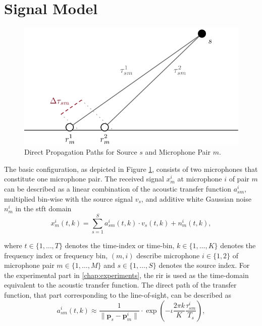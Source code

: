 \section{Signal Model}
\label{sec:signal}

\begin{figure}[!b]
\centering
    \includegraphics[scale=0.8]{data/figures/signal2}
    \caption{Direct Propagation Paths for Source $s$ and Microphone Pair $m$.}
    \label{fig:signal}
\end{figure}

The basic configuration, as depicted in Figure \ref{fig:signal}, consists of two microphones that constitute one microphone pair. The received signal $x^i_m$ at microphone $i$ of pair $m$ can be described as a linear combination of the acoustic transfer function $a^i_{sm}$, multiplied bin-wise with the source signal $v_s$, and additive white Gaussian noise $n^i_m$ in the \acrfull{stft} domain
\begin{equation}
	x_m^i(t,k)=\sum_{s=1}^{S}a_{sm}^i(t,k)\cdot v_s(t,k)+n_m^i(t,k),
	\label{eq:x}
\end{equation}

where $t\in\{1,\dots,T\}$ denotes the time-index or time-bin, $k\in\{1,\dots,K\}$ denotes the frequency index or frequency bin, $(m,i)$ describe microphone $i\in\{1,2\}$ of microphone pair $m\in\{1,\dots,M\}$ and $s\in\{1,\dots,S\}$ denotes the source index. For the experimental part in \autoref{chap:experiments}, the \gls{rir} is used as the time-domain equivalent to the acoustic transfer function. The direct path of the transfer function, that part corresponding to the line-of-sight, can be described as
\begin{equation}
	a_{sm}^i(t,k)\approx\frac{1}{\|\bm p_s-\bm p_m^i\|}\cdot\exp{\left(-\iota\frac{2\pi k}{K}\frac{\tau^i_{sm}}{T_s}\right)},
	\label{eq:acoustic_transfer_function}
\end{equation}


